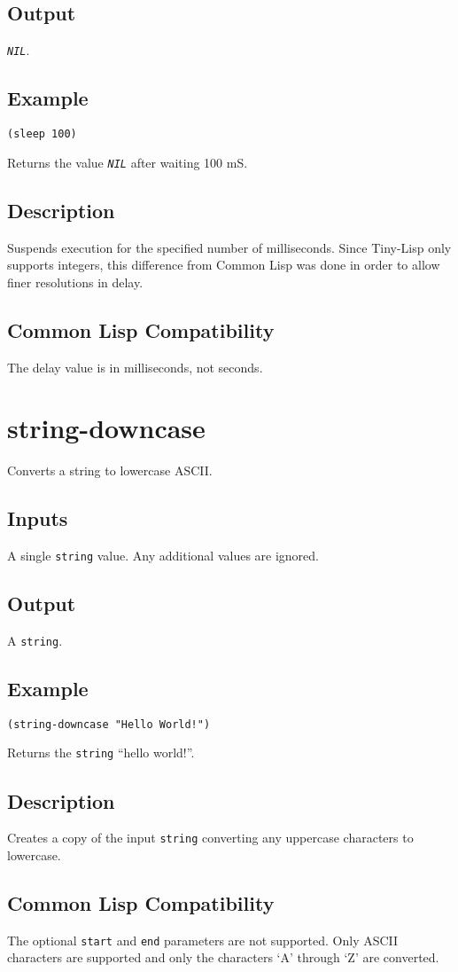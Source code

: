 \documentclass[10pt, openany]{book}
\newcommand{\constant}[1]{\emph{\texttt{#1}}}
\newcommand{\keyword}[1]{\texttt{#1}}
\newcommand{\datatype}[1]{\texttt{#1}}
\newcommand{\tl}{Tiny-Lisp}
\newcommand{\cl}{Common Lisp}
\begin{document}
\subsection{Output}
\constant{NIL}.
\subsection{Example}
\begin{lstlisting}
(sleep 100)
\end{lstlisting}
Returns the value \constant{NIL} after waiting 100 mS.
\subsection{Description}
Suspends execution for the specified number of milliseconds.  Since \tl{} only supports integers, this difference from \cl{} was done in order to allow finer resolutions in delay.
\subsection{Common Lisp Compatibility}
The delay value is in milliseconds, not seconds.

\section{string-downcase}
Converts a string to lowercase ASCII.
\subsection{Inputs}
A single \datatype{string} value.  Any additional values are ignored.
\subsection{Output}
A \datatype{string}.
\subsection{Example}
\begin{lstlisting}
(string-downcase "Hello World!")
\end{lstlisting}
Returns the \datatype{string} ``hello world!''.
\subsection{Description}
Creates a copy of the input \datatype{string} converting any uppercase characters to lowercase.
\subsection{Common Lisp Compatibility}
The optional \keyword{start} and \keyword{end} parameters are not supported.  Only ASCII characters are supported and only the characters `A' through `Z' are converted.
\end{document}
